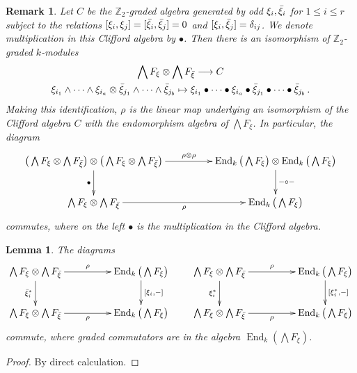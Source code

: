 \documentclass[english,letter paper,12pt,leqno]{article}
\newtheorem{lemma}[theorem]{Lemma}
\theoremstyle{example}
\newtheorem{remark}[theorem]{Remark}
\numberwithin{equation}{section}
\def\be{\begin{equation}}
\def\ee{\end{equation}}
\def\nZ{\mathds{Z}}
\DeclareMathOperator{\End}{End}
\begin{document}
\begin{remark}\label{remark_rhoisoalg} Let $C$ be the $\nZ_2$-graded algebra generated by odd $\xi_i, \Bar{\xi}_i$ for $1 \le i \le r$ subject to the relations $[ \xi_i, \xi_j ] = [ \Bar{\xi}_i, \Bar{\xi}_j ] = 0$ and $[ \xi_i, \Bar{\xi}_j ] = \delta_{ij}$. We denote multiplication in this Clifford algebra by $\bullet$. Then there is an isomorphism of $\nZ_2$-graded $k$-modules
\begin{gather*}
\bigwedge F_\xi \otimes \bigwedge F_{\Bar{\xi}} \longrightarrow C\\
\xi_{i_1} \wedge \cdots \wedge \xi_{i_a} \otimes \Bar{\xi}_{j_1} \wedge \cdots \wedge \Bar{\xi}_{j_b} \mapsto \xi_{i_1} \bullet \cdots \bullet \xi_{i_a} \bullet \Bar{\xi}_{j_1} \bullet \cdots \bullet \Bar{\xi}_{j_b}\,.
\end{gather*}
Making this identification, $\rho$ is the linear map underlying an isomorphism of the Clifford algebra $C$ with the endomorphism algebra of $\bigwedge F_\xi$. In particular, the diagram
\be
\xymatrix@C+2pc{
\big( \bigwedge F_\xi \otimes \bigwedge F_{\Bar{\xi}} \big) \otimes \big( \bigwedge F_\xi \otimes \bigwedge F_{\Bar{\xi}} \big) \ar[r]^-{\rho \otimes \rho}\ar[d]_-\bullet & \End_k\big( \bigwedge F_\xi\big) \otimes \End_k\big( \bigwedge F_\xi \big) \ar[d]^-{- \circ -}\\
\bigwedge F_\xi \otimes \bigwedge F_{\Bar{\xi}} \ar[r]_-\rho & \End_k\big( \bigwedge F_\xi \big)
}
\ee
commutes, where on the left $\bullet$ is the multiplication in the Clifford algebra.
\end{remark}

\begin{lemma}\label{lemma:commutators_on_rho} The diagrams
\[
\xymatrix@C+2pc{
\bigwedge F_\xi \otimes \bigwedge F_{\Bar{\xi}} \ar[d]_-{\Bar{\xi}_i^*} \ar[r]^-{\rho} & \End_k\big( \bigwedge F_\xi \big) \ar[d]^-{[\xi_i, -]}\\
\bigwedge F_\xi \otimes \bigwedge F_{\Bar{\xi}} \ar[r]_-{\rho} & \End_k\big( \bigwedge F_\xi \big)
}
\qquad
\xymatrix@C+2pc{
\bigwedge F_\xi \otimes \bigwedge F_{\Bar{\xi}} \ar[d]_-{\xi_i^*} \ar[r]^-{\rho} & \End_k\big( \bigwedge F_\xi \big) \ar[d]^-{[ \xi_i^*, - ]}\\
\bigwedge F_\xi \otimes \bigwedge F_{\Bar{\xi}} \ar[r]_-{\rho} & \End_k\big( \bigwedge F_\xi \big)
}
\]
commute, where graded commutators are in the algebra $\End_k(\bigwedge F_\xi)$.
\end{lemma}
\begin{proof}
By direct calculation.
\end{proof}
\end{document}
